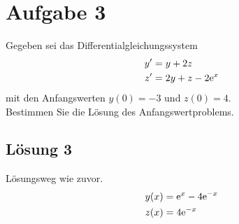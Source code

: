 \documentclass[main.tex]{subfiles}
\begin{document}
\section{Aufgabe 3}
Gegeben sei das Differentialgleichungssystem
\begin{align*}
    y' &= y + 2z \\
    z' &= 2y + z - 2\mathrm{e}^x
\end{align*}
mit den Anfangswerten $y(0) = -3$ und $z(0) = 4$. \\[2mm]
Bestimmen Sie die Lösung des Anfangswertproblems.

\subsection{Lösung 3}
Lösungsweg wie zuvor.
\begin{align*}
    y(x) &= \mathrm{e}^x -4 \mathrm{e}^{-x} \\
    z(x) &= 4\mathrm{e}^{-x}
\end{align*}
\end{document}

